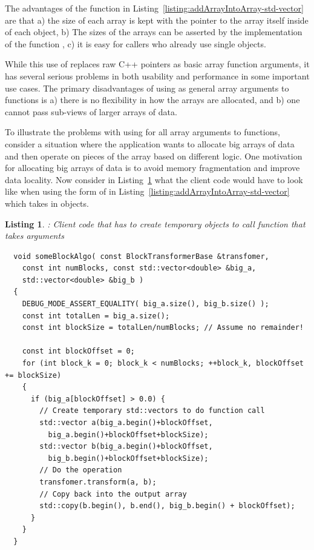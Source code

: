 \documentclass[pdf,ps2pdf,11pt]{SANDreport}
\newtheorem{listing}{Listing}
\begin{document}
The advantages of the function in
Listing~\ref{listing:addArrayIntoArray-std-vector} are that a) the
size of each array is kept with the pointer to the array itself inside
of each {} object, b) The sizes of the arrays can be
asserted by the implementation of the function {},
c) it is easy for callers who already use single {}
objects.

While this use of {} replaces raw C++ pointers as
basic array function arguments, it has several serious problems in
both usability and performance in some important use cases.  The
primary disadvantages of using {} as general array
arguments to functions is a) there is no flexibility in how the arrays
are allocated, and b) one cannot pass sub-views of larger arrays of
data.

To illustrate the problems with using {} for all
array arguments to functions, consider a situation where the
application wants to allocate big arrays of data and then operate on
pieces of the array based on different logic.  One motivation for
allocating big arrays of data is to avoid memory fragmentation and
improve data locality.  Now consider in
Listing~\ref{listing:someBlockAlgo-std-vector} what the client code
would have to look like when using the form of {} 
in Listing~\ref{listing:addArrayIntoArray-std-vector} which takes in
{} objects.

{}\begin{listing}: Client code that has to create temporary
{} objects to call function that takes
{} arguments
\label{listing:someBlockAlgo-std-vector}
{\small\begin{verbatim}
  void someBlockAlgo( const BlockTransformerBase &transfomer,
    const int numBlocks, const std::vector<double> &big_a,
    std::vector<double> &big_b )
  {
    DEBUG_MODE_ASSERT_EQUALITY( big_a.size(), big_b.size() );
    const int totalLen = big_a.size();
    const int blockSize = totalLen/numBlocks; // Assume no remainder!
    
    const int blockOffset = 0;
    for (int block_k = 0; block_k < numBlocks; ++block_k, blockOffset += blockSize)
    {
      if (big_a[blockOffset] > 0.0) {
        // Create temporary std::vectors to do function call
        std::vector a(big_a.begin()+blockOffset,
          big_a.begin()+blockOffset+blockSize);
        std::vector b(big_a.begin()+blockOffset,
          big_b.begin()+blockOffset+blockSize);
        // Do the operation
        transfomer.transform(a, b);
        // Copy back into the output array
        std::copy(b.begin(), b.end(), big_b.begin() + blockOffset);
      }
    }
  }
\end{verbatim}}
\end{listing}
\end{document}
